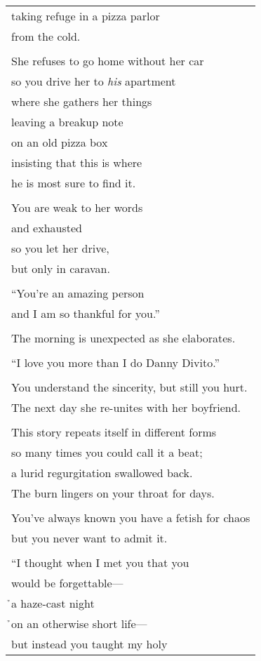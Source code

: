 \documentclass{article}
\begin{document}
\begin{center}
\begin{longtable}{l}
taking refuge in a pizza parlor \\
from the cold. \\
\\
She refuses to go home without her car \\
so you drive her to \textit{his} apartment \\
where she gathers her things \\
leaving a breakup note \\
on an old pizza box \\
insisting that this is where \\
he is most sure to find it. \\
\\
You are weak to her words \\
and exhausted \\
so you let her drive, \\
but only in caravan. \\
\\
``You're an amazing person \\
and I am so thankful for you.'' \\
\\
The morning is unexpected as she elaborates. \\
\\
``I love you more than I do Danny Divito.'' \\
\\
You understand the sincerity, but still you hurt. \\
The next day she re-unites with her boyfriend. \\
\\
This story repeats itself in different forms \\
so many times you could call it a beat; \\
a lurid regurgitation swallowed back. \\
The burn lingers on your throat for days. \\
\\
You've always known you have a fetish for chaos \\
but you never want to admit it. \\
\\
``I thought when I met you that you \\
would be forgettable--- \\
\h{}a haze-cast night \\
\h{}on an otherwise short life--- \\
but instead you taught my holy \\

\end{longtable}
\end{center}
\end{document}
